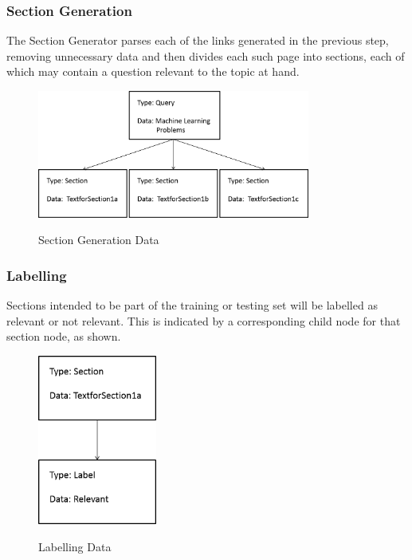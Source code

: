\documentclass[10pt,a4paper]{report}
\begin{document}
\clearpage

\subsubsection{Section Generation}

The Section Generator parses each of the links generated in the previous step, removing unnecessary data and then divides each such page into sections, each of which may contain a question relevant to the topic at hand. 

\begin{figure}[h!]
\centering
\includegraphics[width=0.80\textwidth]{./diagrams/tree3}\\
\caption{Section Generation Data}
\end{figure}

\subsubsection{Labelling}

Sections intended to be part of the training or testing set will be labelled as relevant or not relevant. This is indicated by a corresponding child node for that section node, as shown.

\begin{figure}[h!]
\centering
\includegraphics[width=0.35\textwidth]{./diagrams/tree4}\\
\caption{Labelling Data}
\end{figure}
\end{document}
